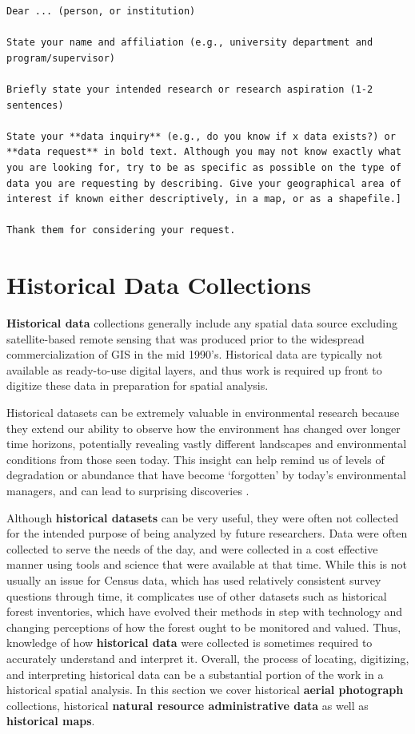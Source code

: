 \documentclass[
]{book}
\begin{document}
\begin{verbatim}
Dear ... (person, or institution)

State your name and affiliation (e.g., university department and program/supervisor)

Briefly state your intended research or research aspiration (1-2 sentences)

State your **data inquiry** (e.g., do you know if x data exists?) or **data request** in bold text. Although you may not know exactly what you are looking for, try to be as specific as possible on the type of data you are requesting by describing. Give your geographical area of interest if known either descriptively, in a map, or as a shapefile.]

Thank them for considering your request. 
\end{verbatim}

\hypertarget{historical-data-collections}{%
\section{Historical Data Collections}\label{historical-data-collections}}

\textbf{Historical data} collections generally include any spatial data source excluding satellite-based remote sensing that was produced prior to the widespread commercialization of GIS in the mid 1990's. Historical data are typically not available as ready-to-use digital layers, and thus work is required up front to digitize these data in preparation for spatial analysis.

Historical datasets can be extremely valuable in environmental research because they extend our ability to observe how the environment has changed over longer time horizons, potentially revealing vastly different landscapes and environmental conditions from those seen today. This insight can help remind us of levels of degradation or abundance that have become `forgotten' by today's environmental managers, and can lead to surprising discoveries \citep{mcclenachan_importance_2015}.

Although \textbf{historical datasets} can be very useful, they were often not collected for the intended purpose of being analyzed by future researchers. Data were often collected to serve the needs of the day, and were collected in a cost effective manner using tools and science that were available at that time. While this is not usually an issue for Census data, which has used relatively consistent survey questions through time, it complicates use of other datasets such as historical forest inventories, which have evolved their methods in step with technology and changing perceptions of how the forest ought to be monitored and valued. Thus, knowledge of how \textbf{historical data} were collected is sometimes required to accurately understand and interpret it. Overall, the process of locating, digitizing, and interpreting historical data can be a substantial portion of the work in a historical spatial analysis. In this section we cover historical \textbf{aerial photograph} collections, historical \textbf{natural resource administrative data} as well as \textbf{historical maps}.
\end{document}
